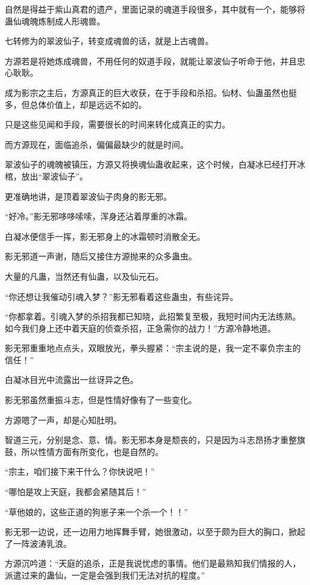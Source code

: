 \begin{this_body}
自然是得益于紫山真君的遗产，里面记录的魂道手段很多，其中就有一个，能够将蛊仙魂魄炼制成人形魂兽。

七转修为的翠波仙子，转变成魂兽的话，就是上古魂兽。

方源若是将她炼成魂兽，不用任何的奴道手段，就能让翠波仙子听命于他，并且忠心耿耿。

成为影宗之主后，方源真正的巨大收获，在于手段和杀招。仙材、仙蛊虽然也挺多，但总体价值上，却是远远不如的。

只是这些见闻和手段，需要很长的时间来转化成真正的实力。

而方源现在，面临追杀，偏偏最缺少的就是时间。

翠波仙子的魂魄被镇压，方源又将换魂仙蛊收起来，这个时候，白凝冰已经打开冰棺，放出“翠波仙子”。

更准确地讲，是顶着翠波仙子肉身的影无邪。

“好冷。”影无邪哆哆嗦嗦，浑身还沾着厚重的冰霜。

白凝冰便信手一挥，影无邪身上的冰霜顿时消散全无。

影无邪道一声谢，随后又接住方源抛来的众多蛊虫。

大量的凡蛊，当然还有仙蛊，以及仙元石。

“你还想让我催动引魂入梦？”影无邪看着这些蛊虫，有些诧异。

“你都拿着。引魂入梦的杀招我都已知晓，此招繁复至极，我短时间内无法练熟。如今我们身上还中着天庭的侦查杀招，正急需你的战力！”方源冷静地道。

影无邪重重地点点头，双眼放光，拳头握紧：“宗主说的是，我一定不辜负宗主的信任！”

白凝冰目光中流露出一丝讶异之色。

影无邪虽然重振斗志，但是性情好像有了一些变化。

方源嗯了一声，却是心知肚明。

智道三元，分别是念、意、情。影无邪本身是颓丧的，只是因为斗志昂扬才重整旗鼓，所以性情方面有所变化，也是自然的。

“宗主，咱们接下来干什么？你快说吧！”

“哪怕是攻上天庭，我都会紧随其后！”

“草他娘的，这些正道的狗崽子来一个杀一个！！”

影无邪一边说，还一边用力地挥舞手臂，她很激动，以至于颇为巨大的胸口，掀起了一阵波涛乳浪。

方源沉吟道：“天庭的追杀，正是我说忧虑的事情。他们是最熟知我们情报的人，派遣过来的蛊仙，一定是会强到我们无法对抗的程度。”


\end{this_body}
